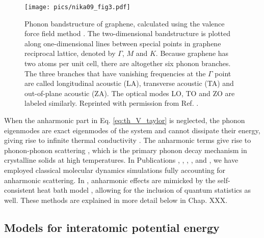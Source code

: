 \begin{figure}
\begin{center}
 \texttt{[image: pics/nika09\_fig3.pdf]}
 \caption{Phonon bandstructure of graphene, calculated using the valence force field method \cite{nika09}. The two-dimensional bandstructure is plotted along one-dimensional lines between special points in graphene reciprocal lattice, denoted by $\Gamma$, $M$ and $K$. Because graphene has two atoms per unit cell, there are altogether six phonon branches. The three branches that have vanishing frequencies at the $\Gamma$ point are called longitudinal acoustic (LA), transverse acoustic (TA) and out-of-plane acoustic (ZA). The optical modes LO, TO and ZO are labeled similarly. Reprinted with permission from Ref. \cite{nika09}.}
\label{fig:th_nika}
\end{center}
\end{figure} 

When the anharmonic part in Eq. \eqref{eq:th_V_taylor} is neglected, the phonon eigenmodes are exact eigenmodes of the system and cannot dissipate their energy, giving rise to infinite thermal conductivity \cite{ziman}. The anharmonic terms give rise to phonon-phonon scattering \cite{ziman}, which is the primary phonon decay mechanism in crystalline solids at high temperatures. In Publications , , , , and , we have employed classical molecular dynamics simulations fully accounting for anharmonic scattering. In , anharmonic effects are mimicked by the self-consistent heat bath model \cite{bolsterli70}, allowing for the inclusion of quantum statistics as well. These methods are explained in more detail below in Chap. XXX.

\subsection{Models for interatomic potential energy}
\label{sec:th_interatomicpotential}


